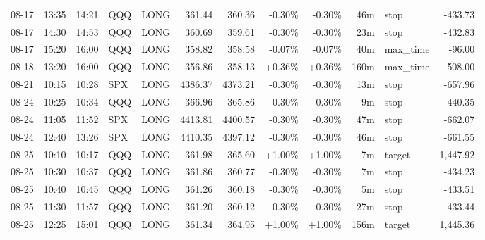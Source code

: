 \documentclass[11pt,a4paper,twoside]{article}
\begin{document}
\begin{center}
\begin{longtable}{>{\color{txtmain}}l l l l l r r r r r >{\color{txtmain}}l r}
08-17 & 13:35 & 14:21 & QQQ & LONG & 361.44 & 360.36 & \textcolor{lossred}{-0.30\%} & \textcolor{lossred}{-0.30\%} & 46m & stop & \textcolor{lossred}{-433.73} \\
08-17 & 14:30 & 14:53 & QQQ & LONG & 360.69 & 359.61 & \textcolor{lossred}{-0.30\%} & \textcolor{lossred}{-0.30\%} & 23m & stop & \textcolor{lossred}{-432.83} \\
08-17 & 15:20 & 16:00 & QQQ & LONG & 358.82 & 358.58 & \textcolor{lossred}{-0.07\%} & \textcolor{lossred}{-0.07\%} & 40m & max\_time & \textcolor{lossred}{-96.00} \\
08-18 & 13:20 & 16:00 & QQQ & LONG & 356.86 & 358.13 & \textcolor{wingreen}{+0.36\%} & \textcolor{wingreen}{+0.36\%} & 160m & max\_time & \textcolor{wingreen}{508.00} \\
08-21 & 10:15 & 10:28 & SPX & LONG & 4386.37 & 4373.21 & \textcolor{lossred}{-0.30\%} & \textcolor{lossred}{-0.30\%} & 13m & stop & \textcolor{lossred}{-657.96} \\
08-24 & 10:25 & 10:34 & QQQ & LONG & 366.96 & 365.86 & \textcolor{lossred}{-0.30\%} & \textcolor{lossred}{-0.30\%} & 9m & stop & \textcolor{lossred}{-440.35} \\
08-24 & 11:05 & 11:52 & SPX & LONG & 4413.81 & 4400.57 & \textcolor{lossred}{-0.30\%} & \textcolor{lossred}{-0.30\%} & 47m & stop & \textcolor{lossred}{-662.07} \\
08-24 & 12:40 & 13:26 & SPX & LONG & 4410.35 & 4397.12 & \textcolor{lossred}{-0.30\%} & \textcolor{lossred}{-0.30\%} & 46m & stop & \textcolor{lossred}{-661.55} \\
08-25 & 10:10 & 10:17 & QQQ & LONG & 361.98 & 365.60 & \textcolor{wingreen}{+1.00\%} & \textcolor{wingreen}{+1.00\%} & 7m & target & \textcolor{wingreen}{1,447.92} \\
08-25 & 10:30 & 10:37 & QQQ & LONG & 361.86 & 360.77 & \textcolor{lossred}{-0.30\%} & \textcolor{lossred}{-0.30\%} & 7m & stop & \textcolor{lossred}{-434.23} \\
08-25 & 10:40 & 10:45 & QQQ & LONG & 361.26 & 360.18 & \textcolor{lossred}{-0.30\%} & \textcolor{lossred}{-0.30\%} & 5m & stop & \textcolor{lossred}{-433.51} \\
08-25 & 11:30 & 11:57 & QQQ & LONG & 361.20 & 360.12 & \textcolor{lossred}{-0.30\%} & \textcolor{lossred}{-0.30\%} & 27m & stop & \textcolor{lossred}{-433.44} \\
08-25 & 12:25 & 15:01 & QQQ & LONG & 361.34 & 364.95 & \textcolor{wingreen}{+1.00\%} & \textcolor{wingreen}{+1.00\%} & 156m & target & \textcolor{wingreen}{1,445.36} \\

\end{longtable}
\end{center}
\end{document}
